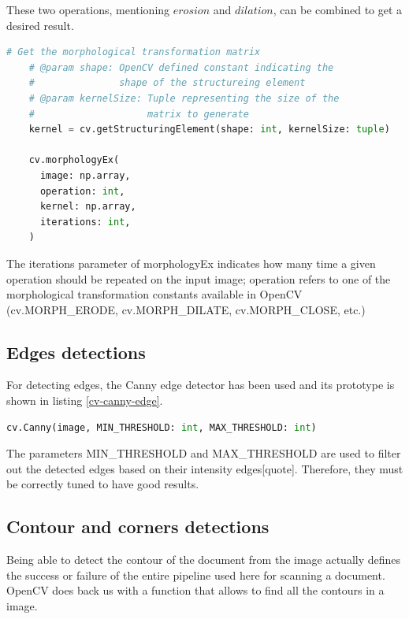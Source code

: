 \documentclass{scrartcl}
\newcommand{\param}[1]{{\ttfamily\footnotesize{#1}}}
\begin{document}
  These two operations, mentioning $erosion$ and $dilation$, can be combined to get a desired result.

  \begin{lstlisting}[language=Python, caption={Morphological transformation}, label={cv-morph-image}]
    # Get the morphological transformation matrix
    # @param shape: OpenCV defined constant indicating the
    #               shape of the structureing element
    # @param kernelSize: Tuple representing the size of the
    #                    matrix to generate
    kernel = cv.getStructuringElement(shape: int, kernelSize: tuple)

    cv.morphologyEx(
      image: np.array,
      operation: int,
      kernel: np.array,
      iterations: int,
    )
  \end{lstlisting}

  The \param{iterations} parameter of \param{morphologyEx} indicates how many time a given operation
  should be repeated on the input image; \param{operation} refers to one of the morphological
  transformation constants available in OpenCV (\param{cv.MORPH\_ERODE}, \param{cv.MORPH\_DILATE},
  \param{cv.MORPH\_CLOSE}, etc.)

  \subsection{Edges detections}

  For detecting edges, the Canny edge detector has been used and its prototype is shown in listing
  \ref{cv-canny-edge}.

  \begin{lstlisting}[language=Python, caption={Canny edge detector}, label={cv-canny-edge}]
    cv.Canny(image, MIN_THRESHOLD: int, MAX_THRESHOLD: int)
  \end{lstlisting}

  The parameters \param{MIN\_THRESHOLD} and \param{MAX\_THRESHOLD} are used to filter out the detected
  edges based on their intensity edges[quote]. Therefore, they must be correctly tuned to have good
  results.

  \subsection{Contour and corners detections}

  Being able to detect the contour of the document from the image actually defines the success or failure of
  the entire pipeline used here for scanning a document. OpenCV does back us with a function that allows
  to find all the contours in a image.
\end{document}
